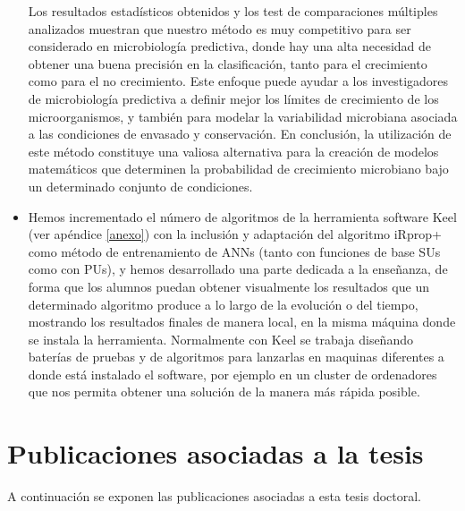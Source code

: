 \begin{itemize}
	Los resultados estadísticos obtenidos y los test de comparaciones múltiples analizados muestran
	que nuestro método es muy competitivo para ser considerado en microbiología predictiva, donde hay
	una alta necesidad de obtener una buena precisión en la clasificación, tanto para el
	crecimiento como para el no crecimiento. Este enfoque puede ayudar a los investigadores de
	microbiología predictiva a definir mejor los límites de crecimiento de los microorganismos, y
	también para modelar la	variabilidad microbiana asociada a las condiciones de envasado y
	conservación. En conclusión, la
	utilización de este método	constituye una valiosa alternativa para la creación de modelos
	matemáticos que determinen la probabilidad de crecimiento microbiano bajo un determinado conjunto
	de condiciones.

   \item Hemos incrementado el número de algoritmos de la herramienta software Keel (ver apéndice
	\ref{anexo}) con	la inclusión y adaptación del algoritmo iRprop+ como método de entrenamiento de
	ANNs (tanto con funciones de base SUs como con PUs), y hemos	desarrollado una parte
dedicada a la enseñanza, de forma que los alumnos puedan
	obtener visualmente	los resultados que un determinado algoritmo produce a lo largo de
la evolución
	o del tiempo,	mostrando los resultados finales de manera local, en la misma máquina donde se
	instala la herramienta. Normalmente con Keel se trabaja diseñando baterías de	pruebas y de
	algoritmos para lanzarlas en maquinas diferentes a donde está instalado el software, por
	ejemplo en un cluster de	ordenadores que nos permita obtener una solución de la manera más
	rápida posible.
\end{itemize}

\section{Publicaciones asociadas a la tesis}
\noindent A continuación se exponen las publicaciones asociadas a esta tesis doctoral.
